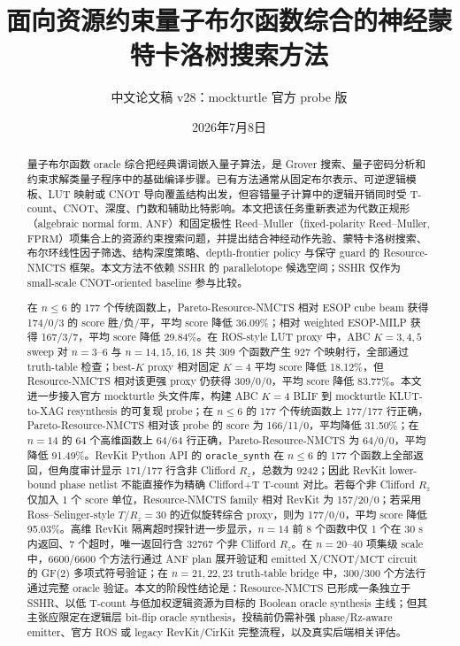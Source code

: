 \documentclass[UTF8,fontset=macnew,11pt]{ctexart}
\title{面向资源约束量子布尔函数综合的神经蒙特卡洛树搜索方法}
\author{中文论文稿 v28：mockturtle 官方 probe 版}
\date{2026年7月8日}
\newcommand{\method}{Resource-NMCTS}
\newcommand{\anf}{\ensuremath{\mathrm{ANF}}}
\newcommand{\fprm}{\ensuremath{\mathrm{FPRM}}}
\newcommand{\mct}{\ensuremath{\mathrm{MCT}}}
\begin{document}
\pagestyle{plain}
\maketitle

\begin{abstract}
量子布尔函数 oracle 综合把经典谓词嵌入量子算法，是 Grover 搜索、量子密码分析和约束求解类量子程序中的基础编译步骤。已有方法通常从固定布尔表示、可逆逻辑模板、LUT 映射或 CNOT 导向覆盖结构出发，但容错量子计算中的逻辑开销同时受 T-count、CNOT、深度、门数和辅助比特影响。本文把该任务重新表述为代数正规形（algebraic normal form, \anf{}）和固定极性 Reed--Muller（fixed-polarity Reed--Muller, \fprm{}）项集合上的资源约束搜索问题，并提出结合神经动作先验、蒙特卡洛树搜索、布尔环线性因子筛选、结构深度策略、depth-frontier policy 与保守 guard 的 \method{} 框架。本文方法不依赖 SSHR 的 parallelotope 候选空间；SSHR 仅作为 small-scale CNOT-oriented baseline 参与比较。

在 $n\leq6$ 的 177 个传统函数上，Pareto-\method{} 相对 ESOP cube beam 获得 174/0/3 的 score 胜/负/平，平均 score 降低 36.09\%；相对 weighted ESOP-MILP 获得 167/3/7，平均 score 降低 29.84\%。在 ROS-style LUT proxy 中，ABC $K=3,4,5$ sweep 对 $n=3$--$6$ 与 $n=14,15,16,18$ 共 309 个函数产生 927 个映射行，全部通过 truth-table 检查；best-$K$ proxy 相对固定 $K=4$ 平均 score 降低 18.12\%，但 \method{} 相对该更强 proxy 仍获得 309/0/0，平均 score 降低 83.77\%。本文进一步接入官方 mockturtle 头文件库，构建 ABC $K=4$ BLIF 到 mockturtle KLUT-to-XAG resynthesis 的可复现 probe；在 $n\leq6$ 的 177 个传统函数上 177/177 行正确，Pareto-\method{} 相对该 probe 的 score 为 166/11/0，平均降低 31.50\%；在 $n=14$ 的 64 个高维函数上 64/64 行正确，Pareto-\method{} 为 64/0/0，平均降低 91.49\%。RevKit Python API 的 \texttt{oracle\_synth} 在 $n\leq6$ 的 177 个函数上全部返回，但角度审计显示 171/177 行含非 Clifford $R_z$，总数为 9242；因此 RevKit lower-bound phase netlist 不能直接作为精确 Clifford+T T-count 对比。若每个非 Clifford $R_z$ 仅加入 1 个 score 单位，Resource-NMCTS family 相对 RevKit 为 157/20/0；若采用 Ross--Selinger-style $T/R_z=30$ 的近似旋转综合 proxy，则为 177/0/0，平均 score 降低 95.03\%。高维 RevKit 隔离超时探针进一步显示，$n=14$ 前 8 个函数中仅 1 个在 30 s 内返回、7 个超时，唯一返回行含 32767 个非 Clifford $R_z$。在 $n=20$--$40$ 项集级 scale 中，6600/6600 个方法行通过 \anf{} plan 展开验证和 emitted X/CNOT/\mct{} circuit 的 GF(2) 多项式符号验证；在 $n=21,22,23$ truth-table bridge 中，300/300 个方法行通过完整 oracle 验证。本文的阶段性结论是：\method{} 已形成一条独立于 SSHR、以低 T-count 与低加权逻辑资源为目标的 Boolean oracle synthesis 主线；但其主张应限定在逻辑层 bit-flip oracle synthesis，投稿前仍需补强 phase/Rz-aware emitter、官方 ROS 或 legacy RevKit/CirKit 完整流程，以及真实后端相关评估。
\end{abstract}
\end{document}
